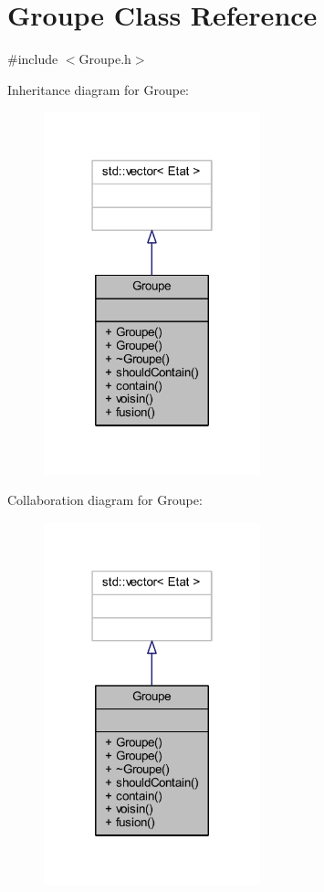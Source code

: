 \hypertarget{class_groupe}{}\section{Groupe Class Reference}
\label{class_groupe}


{\ttfamily \#include $<$Groupe.\+h$>$}



Inheritance diagram for Groupe\+:
\nopagebreak
\begin{figure}[H]
\begin{center}
\leavevmode
\includegraphics[width=178pt]{class_groupe__inherit__graph}
\end{center}
\end{figure}


Collaboration diagram for Groupe\+:
\nopagebreak
\begin{figure}[H]
\begin{center}
\leavevmode
\includegraphics[width=178pt]{class_groupe__coll__graph}
\end{center}
\end{figure}
